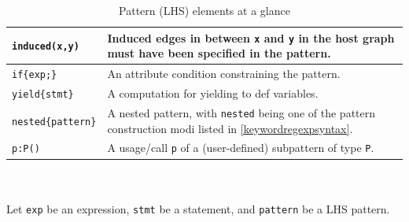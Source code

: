 \begin{table}[htbp]
\begin{minipage}{\linewidth}
\begin{tabularx}{\linewidth}{|lX|}
\texttt{induced(x,y)} & Induced edges in between \texttt{x} and \texttt{y} in the host graph must have been specified in the pattern.\\
\hline
\texttt{if\{exp;\}} & An attribute condition constraining the pattern.\\
\texttt{yield\{stmt\}} & A computation for yielding to def variables.\\
\hline
\texttt{nested\{pattern\}} & A nested pattern, with \texttt{nested} being one of the pattern construction modi listed in \ref{keywordregexpsyntax}.\\
\hline
\texttt{p:P()} & A usage/call \texttt{p} of a (user-defined) subpattern of type \texttt{P}.\\
\hline
\end{tabularx}
\end{minipage}\\
\\ 
{\small Let \texttt{exp} be an expression, \texttt{stmt} be a statement, and \texttt{pattern} be a LHS pattern.}
\caption{Pattern (LHS) elements at a glance}
\label{patternstab}
\end{table}

